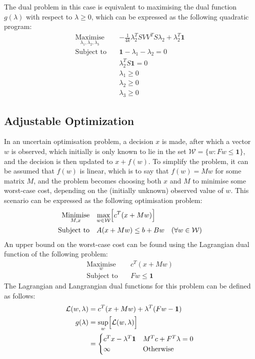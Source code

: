The dual problem in this case is equivalent to maximising the dual function $g(\lambda)$ with respect to $\lambda\ge0$, which can be expressed as the following quadratic program:
\begin{align*}
    \underset{\lambda_1, \lambda_2, \lambda_3}{\text{Maximise}} \quad & -\frac{1}{4k}\lambda_2^TSVV^TS\lambda_2 + \lambda_2^T\mathbf{1} \\
    \text{Subject to} \quad & \mathbf{1} - \lambda_1 - \lambda_2 = 0 \\
    & \lambda_2^TS\mathbf{1} = 0 \\
    & \lambda_1 \ge 0 \\
    & \lambda_2 \ge 0 \\
    & \lambda_3 \ge 0
\end{align*}

\subsection{Adjustable Optimization}
In an uncertain optimisation problem, a decision $x$ is made, after which a vector $w$ is observed, which initially is only known to lie in the set $\mathcal{W} = \{ w: Fw \le \mathbf{1} \}$, and the decision is then updated to $x + f(w)$. To simplify the problem, it can be assumed that $f(w)$ is linear, which is to say that $f(w) = Mw$ for some matrix $M$, and the problem becomes choosing both $x$ and $M$ to minimise some worst-case cost, depending on the (initially unknown) observed value of $w$. This scenario can be expressed as the following optimisation problem:
\begin{align*}
    \underset{M, x}{\text{Minimise}} \quad & \underset{w\in\mathcal{W}}{\max}\Bigl[ c^T(x + Mw) \Bigr] \\
    \text{Subject to} \quad & A(x + Mw) \le b + Bw \quad (\forall w\in\mathcal{W})
\end{align*}
An upper bound on the worst-case cost can be found using the Lagrangian dual function of the following problem:
\begin{align*}
    \underset{w}{\text{Maximise}} \quad & c^T(x + Mw) \\
    \text{Subject to} \quad & Fw \le \mathbf{1}
\end{align*}
The Lagrangian and Langrangian dual functions for this problem can be defined as follows:
\begin{align*}
    \mathcal{L}(w, \lambda) &= c^T(x + Mw) + \lambda^T(Fw - \mathbf{1}) \\
    g(\lambda) &= \underset{w}{\sup}\Bigl[\mathcal{L}(w, \lambda)\Bigr] \\
    &= \begin{cases}
        c^Tx - \lambda^T\mathbf{1} & M^Tc + F^T\lambda = 0 \\
        \infty & \text{Otherwise}
    \end{cases}
\end{align*}
